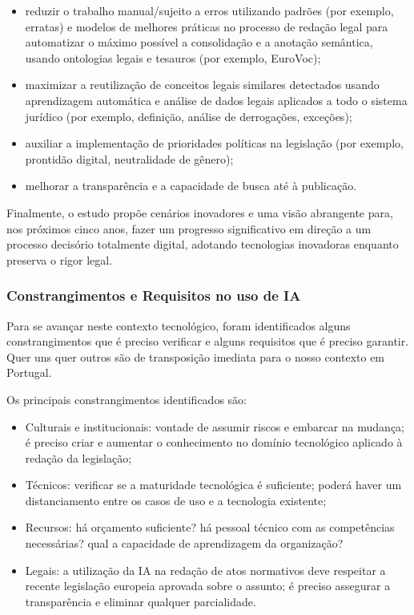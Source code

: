 \begin{itemize}

\item reduzir o trabalho manual/sujeito a erros utilizando padrões (por exemplo, erratas) e modelos 
de melhores práticas no processo de redação legal para automatizar o máximo possível a consolidação 
e a anotação semântica, usando ontologias legais e tesauros (por exemplo, EuroVoc);
\item maximizar a reutilização de conceitos legais similares detectados usando aprendizagem automática 
e análise de dados legais aplicados a todo o sistema jurídico (por exemplo, definição, 
análise de derrogações, exceções);
\item auxiliar a implementação de prioridades políticas na legislação (por exemplo, prontidão digital, 
neutralidade de gênero); 
\item melhorar a transparência e a capacidade de busca até à publicação.

\end{itemize}

Finalmente, o estudo propõe cenários inovadores e uma visão abrangente para, nos próximos cinco anos, 
fazer um progresso significativo em direção a um processo decisório totalmente digital, 
adotando tecnologias inovadoras enquanto preserva o rigor legal.

\subsubsection{Constrangimentos e Requisitos no uso de IA}

Para se avançar neste contexto tecnológico, foram identificados alguns constrangimentos 
que é preciso verificar e alguns requisitos que é preciso garantir. 
Quer uns quer outros são de transposição imediata para o nosso contexto em Portugal.

Os principais constrangimentos identificados são:

\begin{itemize}
    \item Culturais e institucionais: vontade de assumir riscos e embarcar na 
    mudança; é preciso criar e aumentar o conhecimento no domínio tecnológico 
    aplicado à redação da legislação;
    \item Técnicos: verificar se a maturidade tecnológica é suficiente; 
    poderá haver um distanciamento entre os casos de uso e a tecnologia existente;
    \item Recursos: há orçamento suficiente? há pessoal técnico com as 
    competências necessárias? qual a capacidade de aprendizagem da organização? 
    \item Legais: a utilização da IA na redação de atos normativos deve respeitar a
    recente legislação europeia aprovada sobre o assunto; é preciso assegurar 
    a transparência e eliminar qualquer parcialidade.
\end{itemize}

